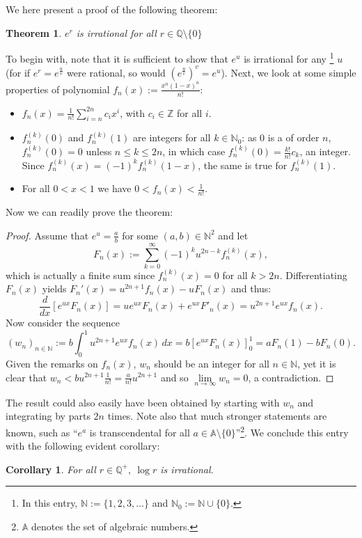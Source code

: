 \documentclass[12pt]{article}
\newtheorem*{thm}{Theorem}
\newtheorem*{cor}{Corollary}
\newcommand{\bbN}{\mathbb{N}}
\newcommand{\bbZ}{\mathbb{Z}}
\newcommand{\bbQ}{\mathbb{Q}}
\newcommand{\bbA}{\mathbb{A}}
\begin{document}
We here present a proof of the following theorem:
\begin{thm} \( e^r \) is irrational for all \( r\in\bbQ\setminus\{0\} \) \end{thm}
To begin with, note that it is sufficient to show that \( e^u \) is irrational for any \footnote{In this entry, \( \bbN := \{1,2,3,\dotsc\} \) and \(\bbN_0 := \bbN \cup \{0\}\).} \( u \) (for if \( e^r = e^{\frac{u}{v}} \) were rational, so would \(( e^{\frac{u}{v}})^v = e^u \)). Next, we look at some simple properties of polynomial \( \displaystyle f_n(x) := \frac{x^n (1-x)^n}{n!} \): 
\begin{itemize}
\item \( \displaystyle f_n(x)=\frac{1}{n!}\sum_{i=n}^{2n} c_i x^i \), with \( c_i \in \bbZ \) for all \( i \). 
\item \(f_n^{(k)}(0)\) and \(f_n^{(k)}(1)\) are integers for all \( k\in\bbN_0 \): as \( 0 \) is a  of order \( n \), \( f_n^{(k)}(0)=0 \) unless \( n\leq k\leq 2n \), in which case \( f_n^{(k)}(0)=\frac{k!}{n!} c_k \), an integer. Since \( f_n^{(k)}(x)=(-1)^k f_n^{(k)}(1-x) \), the same is true for \( f_n^{(k)}(1) \).
\item For all \( 0<x<1 \) we have \( 0<f_n(x)<\frac{1}{n!} \). 
\end{itemize}
Now we can readily prove the theorem:
\begin{proof}
Assume that \( e^u=\frac{a}{b} \) for some \( (a,b)\in\bbN^2 \) and let
\[ F_n(x) := \sum_{k=0}^\infty (-1)^k u^{2n-k} f_n^{(k)}(x), \] 
which is actually a finite sum since \( f_n^{(k)}(x)=0 \) for all \( k>2n \). Differentiating \( F_n(x) \) yields \( F_n'(x)= u^{2n+1} f_n(x) - u F_n(x) \) and thus:
\[ \frac{d}{dx}\left[e^{ux} F_n(x)\right] = ue^{ux} F_n(x) + e^{ux} F'_n(x) = u^{2n+1} e^{ux} f_n(x). \]
Now consider the sequence
\[ (w_n)_{n\in\bbN} := b\int_0^1 u^{2n+1}e^{ux}f_n(x)\,dx = b\left[ e^{ux} F_n(x) \right]^1_0 = a F_n(1) - b F_n(0). \]
Given the remarks on \( f_n(x) \), \( w_n \) should be an integer for all \( n\in\bbN \), yet it is clear that \( w_n < b u^{2n+1}\frac{1}{n!} = \frac{a}{n!} u^{2n+1} \) and so \( \lim\limits_{n\to\infty}w_n = 0 \), a contradiction.
\end{proof}

The result could also easily have been obtained by starting with \( w_n \) and integrating by parts \( 2n \) times. Note also that much stronger statements are known, such as ``\( e^a \) is transcendental for all \( a\in\bbA\setminus\{0\} \)''\footnote{\(\bbA\) denotes the set of algebraic numbers.}. We conclude this entry with the following evident corollary:
\begin{cor} For all \( r\in\bbQ^{+},\: \log r\) is irrational. \end{cor}
\end{document}
